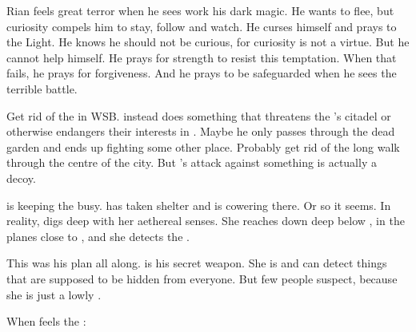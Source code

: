 \begin{changes}
    Rian feels great terror when he sees \Ishnaruchaefir work his dark magic.
    He wants to flee, but curiosity compels him to stay, follow and watch.
    He curses himself and prays to the Light.
    He knows he should not be curious, for curiosity is not a virtue.
    But he cannot help himself.
    He prays for strength to resist this temptation.
    When that fails, he prays for forgiveness.
    And he prays to be safeguarded when he sees the terrible battle.

    Get rid of the \noggyal in WSB.
    \Ishnaruchaefir instead does something that threatens the \resphain's citadel or otherwise endangers their interests in \Malcur.
    Maybe he only passes through the dead garden and ends up fighting \Teshrial some other place.
    Probably get rid of the long walk through the centre of the city.
    But \Ishnaruchaefir's attack against something is actually a decoy.
    
    \Ishnaruchaefir is keeping the \resphain busy.
    \Criseis has taken shelter and is cowering there.
    Or so it seems. 
    In reality, \Criseis digs deep with her aethereal senses.
    She reaches down deep below \Malcur, in the planes close to \Nyx, and she detects the \noggyaleth.
    
    This was his plan all along. 
    \Criseis is his secret weapon. 
    She is  and can detect things that are supposed to be hidden from everyone.
    But few people suspect, because she is just a lowly \scatha. 
    
    When \Criseis feels the \noggyal:
    
    

\end{changes}
